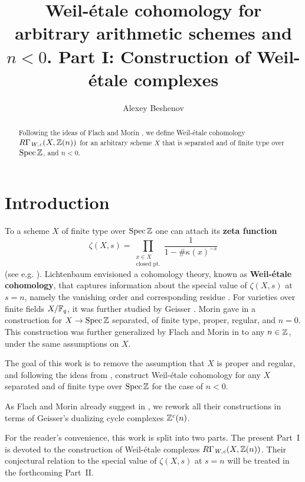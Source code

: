 \documentclass{article}
\title{Weil-étale cohomology for arbitrary arithmetic schemes and $n < 0$.
  Part I: Construction of Weil-étale complexes}
\author{Alexey Beshenov}
\numberwithin{equation}{section}
\begin{document}
\maketitle

\begin{abstract}
  Following the ideas of Flach and Morin \cite{Flach-Morin-2018}, we define
  Weil-étale cohomology $R\Gamma_{\text{\it W,c}} (X, \mathbb{Z} (n))$ for an arbitrary scheme $X$
  that is separated and of finite type over $\operatorname{Spec} \mathbb{Z}$, and $n < 0$.
\end{abstract}

\tableofcontents


\section{Introduction}

To a scheme $X$ of finite type over $\operatorname{Spec} \mathbb{Z}$ one can attach its
\textbf{zeta function}
$$\zeta (X,s) = \prod_{\substack{x \in X \\ \text{closed pt.}}} \frac{1}{1 - \#\kappa (x)^{-s}}$$
(see e.g. \cite{Serre-1965}). Lichtenbaum envisioned a cohomology theory, known
as \textbf{Weil-étale cohomology}, that captures information about the special
value of $\zeta (X,s)$ at $s = n$, namely the vanishing order and corresponding
residue
\cite{Lichtenbaum-2005,Lichtenbaum-2009-number-rings,Lichtenbaum-2009-Euler-char}.
For varieties over finite fields $X/\mathbb{F}_q$, it was further studied by Geisser
\cite{Geisser-2004,Geisser-2006,Geisser-2010-arithmetic-homology}.
Morin gave in \cite{Morin-2014} a construction for $X \to \operatorname{Spec}\mathbb{Z}$ separated,
of finite type, proper, regular, and $n = 0$. This construction was further
generalized by Flach and Morin in \cite{Flach-Morin-2018} to any $n \in \mathbb{Z}$,
under the same assumptions on $X$.

The goal of this work is to remove the assumption that $X$ is proper and
regular, and following the ideas from \cite{Flach-Morin-2018}, construct
Weil-étale cohomology for any $X$ separated and of finite type over $\operatorname{Spec}\mathbb{Z}$
for the case of $n < 0$.

As Flach and Morin already suggest in \cite[Remark 3.11]{Flach-Morin-2018},
we rework all their constructions in terms of Geisser's dualizing cycle
complexes $\mathbb{Z}^c (n)$.

For the reader's convenience, this work is split into two parts. The present
Part~I is devoted to the construction of Weil-étale complexes
$R\Gamma_{\text{\it W,c}} (X, \mathbb{Z} (n))$. Their conjectural relation to the special value
of $\zeta (X,s)$ at $s = n$ will be treated in the forthcoming Part~II.
\end{document}
